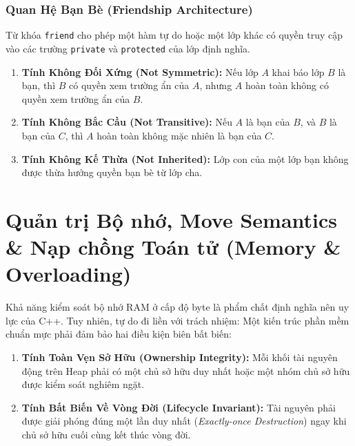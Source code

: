 \documentclass[12pt,a4paper,oneside]{book}
\begin{document}
\subsection{Quan Hệ Bạn Bè (Friendship Architecture)}

Từ khóa \texttt{friend} cho phép một hàm tự do hoặc một lớp khác có quyền truy cập vào các trường \texttt{private} và \texttt{protected} của lớp định nghĩa.

\begin{theorybox}
\begin{enumerate}
    \item \textbf{Tính Không Đối Xứng (Not Symmetric):} Nếu lớp $A$ khai báo lớp $B$ là bạn, thì $B$ có quyền xem trường ẩn của $A$, nhưng $A$ hoàn toàn không có quyền xem trường ẩn của $B$.
    \item \textbf{Tính Không Bắc Cầu (Not Transitive):} Nếu $A$ là bạn của $B$, và $B$ là bạn của $C$, thì $A$ hoàn toàn không mặc nhiên là bạn của $C$.
    \item \textbf{Tính Không Kế Thừa (Not Inherited):} Lớp con của một lớp bạn không được thừa hưởng quyền bạn bè từ lớp cha.
\end{enumerate}
\end{theorybox}

\chapter{Quản trị Bộ nhớ, Move Semantics \& Nạp chồng Toán tử (Memory \& Overloading)}

\begin{theorybox}
Khả năng kiểm soát bộ nhớ RAM ở cấp độ byte là phẩm chất định nghĩa nên uy lực của C++. Tuy nhiên, tự do đi liền với trách nhiệm: Một kiến trúc phần mềm chuẩn mực phải đảm bảo hai điều kiện biên bất biến:
\begin{enumerate}
    \item \textbf{Tính Toàn Vẹn Sở Hữu (Ownership Integrity):} Mỗi khối tài nguyên động trên Heap phải có một chủ sở hữu duy nhất hoặc một nhóm chủ sở hữu được kiểm soát nghiêm ngặt.
    \item \textbf{Tính Bất Biến Về Vòng Đời (Lifecycle Invariant):} Tài nguyên phải được giải phóng đúng một lần duy nhất (\textit{Exactly-once Destruction}) ngay khi chủ sở hữu cuối cùng kết thúc vòng đời.
\end{enumerate}
\end{theorybox}
\end{document}
